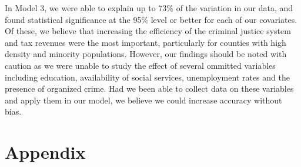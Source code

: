 \documentclass[]{article}
\newenvironment{Shaded}{}{}
\newcommand{\CommentTok}[1]{\textcolor[rgb]{0.00,0.50,0.00}{#1}}
\newcommand{\DataTypeTok}[1]{#1}
\newcommand{\DecValTok}[1]{#1}
\newcommand{\KeywordTok}[1]{\textcolor[rgb]{0.00,0.00,1.00}{#1}}
\newcommand{\NormalTok}[1]{#1}
\newcommand{\OperatorTok}[1]{#1}
\newcommand{\StringTok}[1]{\textcolor[rgb]{0.00,0.50,0.50}{#1}}
\begin{document}
In Model 3, we were able to explain up to 73\% of the variation in our
data, and found statistical significance at the 95\% level or better for
each of our covariates. Of these, we believe that increasing the
efficiency of the criminal justice system and tax revenues were the most
important, particularly for counties with high density and minority
populations. However, our findings should be noted with caution as we
were unable to study the effect of several ommitted variables including
education, availability of social services, unemployment rates and the
presence of organized crime. Had we been able to collect data on these
variables and apply them in our model, we believe we could increase
accuracy without bias.

\hypertarget{appendix}{%
\section{Appendix}\label{appendix}}

\begin{Shaded}
\end{Shaded}
\end{document}
